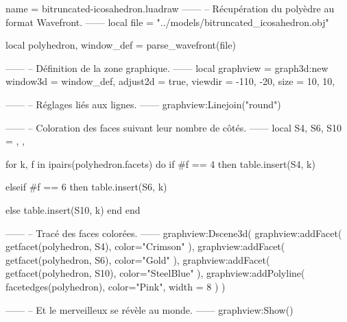 \documentclass{standalone}
\begin{document}
\begin{luadraw}{name = bitruncated-icosahedron.luadraw}
------
-- Récupération du polyèdre au format Wavefront.
------
local file = "../models/bitruncated_icosahedron.obj"

local polyhedron, window_def = parse_wavefront(file)

------
-- Définition de la zone graphique.
------
local graphview = graph3d:new{
  window3d = window_def,
  adjust2d = true,
  viewdir  = {-110, -20},
  size     = {10, 10},
}

------
-- Réglages liés aux lignes.
------
graphview:Linejoin("round")

------
-- Coloration des faces suivant leur nombre de côtés.
------
local S4, S6, S10 = {}, {}, {}

for k, f in ipairs(polyhedron.facets) do
  if #f == 4 then
    table.insert(S4, k)

  elseif #f == 6 then
    table.insert(S6, k)

  else
    table.insert(S10, k)
  end
end

------
-- Tracé des faces colorées.
------
graphview:Dscene3d(
  graphview:addFacet(
    getfacet(polyhedron, S4),
    {
      color="Crimson"
    }),
  graphview:addFacet(
    getfacet(polyhedron, S6),
    {
      color="Gold"
    }),
  graphview:addFacet(
    getfacet(polyhedron, S10),
    {
      color="SteelBlue"
    }),
  graphview:addPolyline(
    facetedges(polyhedron),
    {
      color="Pink",
      width = 8
    })
)

------
-- Et le merveilleux se révèle au monde.
------
graphview:Show()
\end{luadraw}
\end{document}
